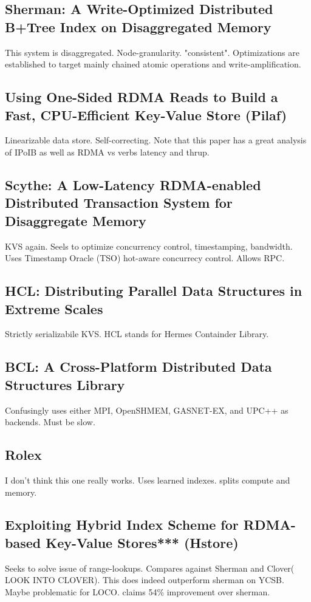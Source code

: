 \documentclass[sigplan,nonacm]{acmart}
\begin{document}
    \subsection{Sherman: A Write-Optimized Distributed B+Tree Index on Disaggregated Memory}
    This system is disaggregated. Node-granularity. "consistent". Optimizations are established
    to target mainly chained atomic operations and write-amplification. \cite{Wang-SIGMOD-2022}

    \subsection{Using One-Sided RDMA Reads to Build a Fast, CPU-Efficient Key-Value Store (Pilaf) }
    Linearizable data store.  Self-correcting. Note that this paper has a great 
    analysis of IPoIB as well as RDMA vs verbs latency and thrup. \cite{Mitchell-ATC-2013}

    \subsection{Scythe: A Low-Latency RDMA-enabled Distributed Transaction System for Disaggregate Memory }
    KVS again. Seels to optimize concurrency control, timestamping, bandwidth. Uses Timestamp Oracle (TSO)
    hot-aware concurrecy control. Allows RPC. \cite{Lu-ACMtrans-2024}

    \subsection{HCL: Distributing Parallel Data Structures in Extreme Scales}
    Strictly serializabile KVS. HCL stands for Hermes Containder Library. \cite{Devarajan-CLUSTER-2020}

    \subsection{BCL: A Cross-Platform Distributed Data Structures Library}
    Confusingly uses either MPI, OpenSHMEM, GASNET-EX, and UPC++ as backends. Must be slow. \cite{Brock-ICPP-2019}
    
    \subsection{Rolex}
    I don't think this one really works. Uses learned indexes. splits compute and memory. \cite{Li-FAST-2023}

    \subsection{Exploiting Hybrid Index Scheme for RDMA-based Key-Value Stores*** (Hstore)}
    Seeks to solve issue of range-lookups. Compares against Sherman and Clover( LOOK INTO CLOVER). 
    This does indeed outperform sherman on YCSB. Maybe problematic for LOCO. claims 54\% improvement 
    over sherman.\cite{Han-SYSTOR-2023}
\end{document}
